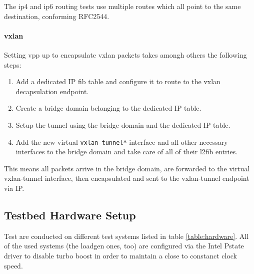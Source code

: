 The \Ac{ip4} and \Ac{ip6} routing tests use multiple routes which all
point to the same destination, conforming RFC2544.

\paragraph{\Ac{vxlan}}

Setting \Ac{vpp} up to encapsulate \Ac{vxlan} packets takes amongh
others the following steps:

\begin{enumerate}
	\item Add a dedicated IP \Ac{fib} table and configure it to route to the \Ac{vxlan} decapsulation endpoint.
	\item Create a bridge domain belonging to the dedicated IP table.
	\item Setup the tunnel using the bridge domain and the dedicated IP table.
	\item Add the new virtual \lstinline|vxlan-tunnel*| interface and all other necessary interfaces to the bridge domain and take care of all of their l2fib entries. 
\end{enumerate}

This means all packets arrive in the bridge domain, are forwarded to
the virtual vxlan-tunnel interface, then encapsulated and sent to the
vxlan-tunnel endpoint via IP.


\subsection{Testbed Hardware Setup}
\label{sec:hardware}

Test are conducted on different test systems listed in table
\ref{table:hardware}. All of the used systems (the \Ac{loadgen} ones,
too) are configured via the Intel Pstate driver to disable turbo boost
in order to maintain a close to constanct clock speed.


